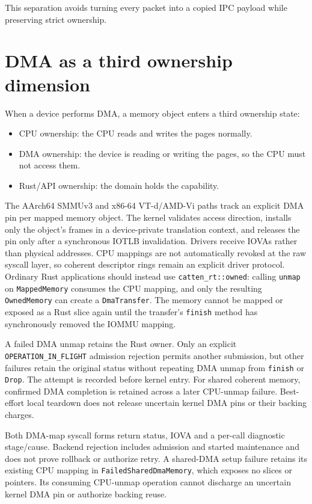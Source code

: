 This separation avoids turning every packet into a copied IPC payload while
preserving strict ownership.

\section{DMA as a third ownership dimension}

When a device performs DMA, a memory object enters a third ownership state:

\begin{itemize}
    \item CPU ownership: the CPU reads and writes the pages normally.
    \item DMA ownership: the device is reading or writing the pages, so the
        CPU must not access them.
    \item Rust/API ownership: the domain holds the capability.
\end{itemize}

The AArch64 SMMUv3 and x86-64 VT-d/AMD-Vi paths track an explicit DMA pin per
mapped memory object. The kernel validates access direction, installs only the
object's frames in a device-private translation context, and releases the pin
only after a synchronous IOTLB invalidation. Drivers receive IOVAs rather than
physical addresses. CPU mappings are not automatically revoked at the raw
syscall layer, so coherent descriptor rings remain an explicit driver protocol.
Ordinary Rust applications should instead use \texttt{catten\_rt::owned}:
calling \texttt{unmap} on \texttt{MappedMemory} consumes the CPU mapping, and
only the resulting \texttt{OwnedMemory} can create a \texttt{DmaTransfer}.
The memory cannot be mapped or exposed as a Rust slice again until the
transfer's \texttt{finish} method has synchronously removed the IOMMU mapping.

A failed DMA unmap retains the Rust owner. Only an explicit
\texttt{OPERATION\_IN\_FLIGHT} admission rejection permits another submission, but
other failures retain the original status without repeating DMA unmap from
\texttt{finish} or \texttt{Drop}. The attempt is recorded before kernel entry.
For shared coherent memory, confirmed DMA completion is retained across a later
CPU-unmap failure. Best-effort local teardown does not release uncertain kernel
DMA pins or their backing charges.

Both DMA-map syscall forms return status, IOVA and a per-call diagnostic
stage/cause. Backend rejection includes admission and started maintenance
and does not prove rollback or authorize retry. A shared-DMA setup failure
retains its existing CPU mapping in \texttt{FailedSharedDmaMemory}, which exposes
no slices or pointers. Its consuming CPU-unmap operation cannot discharge an
uncertain kernel DMA pin or authorize backing reuse.



